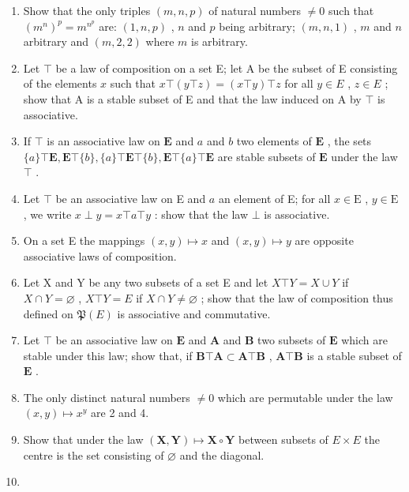 \begin{enumerate}
\def\labelenumi{\arabic{enumi}.}
\setcounter{enumi}{4}
\item
  Show that the only triples \((m, n, p)\) of natural numbers \(\neq 0\) such that \((m^n)^p = m^{n^p}\) are: \((1, n, p)\) , \(n\) and \(p\) being arbitrary; \((m, n, 1)\) , \(m\) and \(n\) arbitrary and \((m, 2, 2)\) where \(m\) is arbitrary.
\item
  Let \(\top\) be a law of composition on a set E; let A be the subset of E consisting of the elements \(x\) such that \(x \top (y \top z) = (x \top y) \top z\) for all \(y \in E\) , \(z \in E\) ; show that A is a stable subset of E and that the law induced on A by \(\top\) is associative.
\item
  If \(\top\) is an associative law on \(\mathbf{E}\) and \(a\) and \(b\) two elements of \(\mathbf{E}\) , the sets \(\{a\} \top \mathbf{E}, \mathbf{E} \top \{b\}, \{a\} \top \mathbf{E} \top \{b\}, \mathbf{E} \top \{a\} \top \mathbf{E}\) are stable subsets of \(\mathbf{E}\) under the law \(\top\) .
\item
  Let \(\top\) be an associative law on E and \(a\) an element of E; for all \(x \in \mathrm{E}\) , \(y \in \mathrm{E}\) , we write \(x \perp y = x \top a \top y\) : show that the law \(\bot\) is associative.
\item
  On a set E the mappings \((x,y)\mapsto x\) and \((x,y)\mapsto y\) are opposite associative laws of composition.
\item
  Let X and Y be any two subsets of a set E and let \(X \top Y = X \cup Y\) if \(X \cap Y = \varnothing\) , \(X \top Y = E\) if \(X \cap Y \neq \varnothing\) ; show that the law of composition thus defined on \(\mathfrak{P}(E)\) is associative and commutative.
\item
  Let \(\top\) be an associative law on \(\mathbf{E}\) and \(\mathbf{A}\) and \(\mathbf{B}\) two subsets of \(\mathbf{E}\) which are stable under this law; show that, if \(\mathbf{B} \top \mathbf{A} \subset \mathbf{A} \top \mathbf{B}\) , \(\mathbf{A} \top \mathbf{B}\) is a stable subset of \(\mathbf{E}\) .
\item
  The only distinct natural numbers \(\neq 0\) which are permutable under the law \((x,y)\mapsto x^{y}\) are 2 and 4.
\item
  Show that under the law \((\mathbf{X}, \mathbf{Y}) \mapsto \mathbf{X} \circ \mathbf{Y}\) between subsets of \(E \times E\) the centre is the set consisting of \(\varnothing\) and the diagonal.
\item

\end{enumerate}
